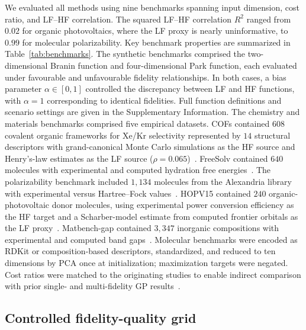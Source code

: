 \documentclass[11pt,a4paper]{article}%
\begin{document}
We evaluated all methods using nine benchmarks spanning input dimension, cost ratio, and LF--HF
correlation. The squared LF--HF correlation $R^2$ ranged from $0.02$ for organic
photovoltaics, where the LF proxy is nearly uninformative, to $0.99$ for molecular polarizability.
Key benchmark properties are summarized in Table~\ref{tab:benchmarks}. The synthetic benchmarks comprised the two-dimensional Branin function
and four-dimensional Park function, each evaluated under favourable and unfavourable fidelity relationships. In both cases, a
bias parameter $\alpha \in [0,1]$ controlled the discrepancy between LF and HF functions, with $\alpha = 1$ corresponding to identical fidelities. Full function definitions and scenario settings are given in the Supplementary
Information. The chemistry and materials benchmarks comprised five empirical datasets. COFs contained $608$ covalent organic
frameworks for Xe/Kr selectivity represented by $14$ structural descriptors with grand-canonical
Monte Carlo simulations as the HF source and Henry's-law estimates as the LF source ($\rho =
0.065$)~\citep{gantzler2023multifidelity}. FreeSolv contained $640$ molecules with experimental
and computed hydration free energies~\citep{mobley2014freesolv}. The polarizability benchmark included
$1{,}134$ molecules from the Alexandria library with experimental versus Hartree--Fock
values~\citep{ghahremanpour2018alexandria, fare2022multi}. HOPV15 contained $240$
organic-photovoltaic donor molecules, using experimental power conversion efficiency as the HF target
and a Scharber-model estimate from computed frontier orbitals as the LF
proxy~\citep{lopez2016harvard}.
Matbench-gap contained $3{,}347$ inorganic compositions with experimental and computed band
gaps~\citep{dunn2020benchmarking}. Molecular benchmarks were encoded as RDKit or composition-based descriptors,
standardized, and reduced to ten dimensions by PCA once at
initialization; maximization targets were negated. Cost ratios were matched to the originating
studies to enable indirect comparison with prior single- and multi-fidelity GP
results~\citep{sabanza2025best}.

\subsection{Controlled fidelity-quality grid}\label{sec:meth-grid}
\end{document}
